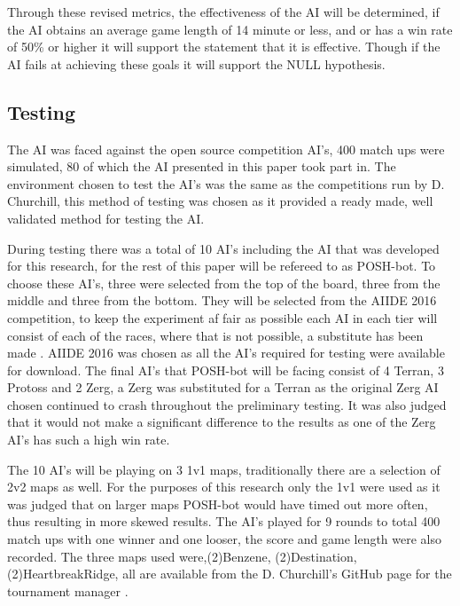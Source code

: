 \documentclass[journal]{IEEEtran}
\begin{document}
Through these revised metrics, the effectiveness of the AI will be determined, if the AI obtains an average game length of 14 minute or less, and or has a win rate of 50\% or higher it will support the statement that it is effective. Though if the AI fails at achieving these goals it will support the NULL hypothesis.

\subsection{Testing}
The AI was faced against the open source competition AI's, 400 match ups were simulated, 80 of which the AI presented in this paper took part in. The environment chosen to test the AI's was the same as the competitions run by D. Churchill, this method of testing was chosen as it provided a ready made, well validated method for testing the AI.

During testing there was a total of 10 AI's including the AI that was developed for this research, for the rest of this paper will be refereed to as POSH-bot. To choose these AI's, three were selected from the top of the board, three from the middle and three from the bottom. They will be selected from the AIIDE 2016 competition, to keep the experiment af fair as possible each AI in each tier will consist of each of the races, where that is not possible, a substitute has been made \cite{2016}. AIIDE 2016 was chosen as all the AI's required for testing were available for download. The final AI's that POSH-bot will be facing consist of 4 Terran, 3 Protoss and 2 Zerg, a Zerg was substituted for a Terran as the original Zerg AI chosen continued to crash throughout the preliminary testing. It was also judged that it would not make a significant difference to the results as one of the Zerg AI's has such a high win rate.

The 10 AI's will be playing on 3 1v1 maps, traditionally there are a selection of 2v2 maps as well. For the purposes of this research only the 1v1 were used as it was judged that on larger maps POSH-bot would have timed out more often, thus resulting in more skewed results. The AI's played for 9 rounds to total 400 match ups with one winner and one looser, the score and game length were also recorded. The three maps used were,(2)Benzene, (2)Destination, (2)HeartbreakRidge, all are available from the D. Churchill's GitHub page for the tournament manager \cite{Tournament}. 
\end{document}
